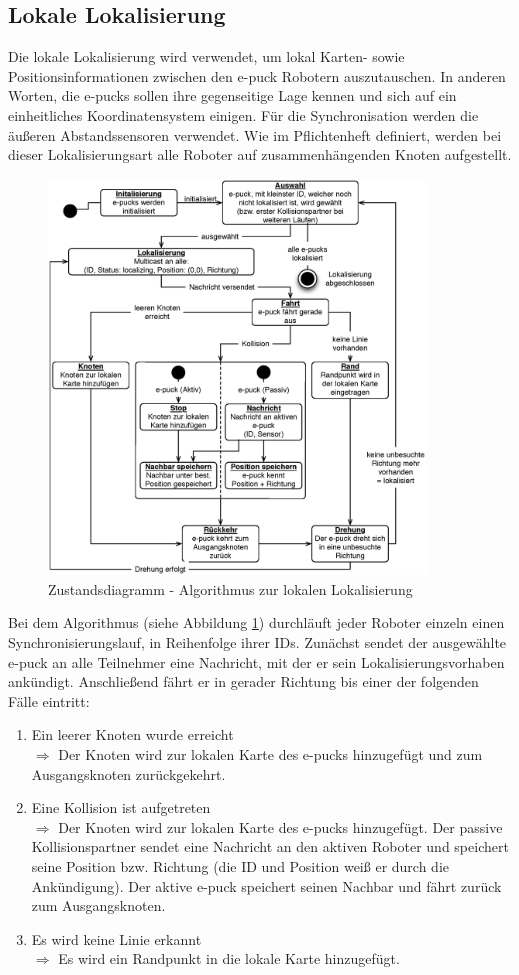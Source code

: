 \documentclass[10pt,a4paper]{article}
\begin{document}
		\subsection{Lokale Lokalisierung}
			Die lokale Lokalisierung wird verwendet, um lokal Karten- sowie Positionsinformationen zwischen den
			e-puck Robotern auszutauschen. In anderen Worten, die e-pucks sollen ihre gegenseitige Lage kennen und sich auf ein einheitliches
			Koordinatensystem einigen. Für die Synchronisation werden die äußeren Abstandssensoren verwendet. Wie im Pflichtenheft definiert,
			werden bei dieser Lokalisierungsart alle Roboter auf zusammenhängenden Knoten aufgestellt.
			 \begin{figure}[h]
				\centering
				\includegraphics[width=10cm]{images/lokale_lokalisierung.eps}
  				\caption{Zustandsdiagramm - Algorithmus zur lokalen Lokalisierung}
  				\label{fig:lokale_lokalisierung}
  			\end{figure}
			Bei dem Algorithmus (siehe Abbildung \ref{fig:lokale_lokalisierung}) durchläuft jeder Roboter einzeln einen Synchronisierungslauf, in Reihenfolge ihrer IDs.
			Zunächst sendet der ausgewählte e-puck an alle Teilnehmer eine Nachricht, mit der er sein Lokalisierungsvorhaben ankündigt.
			Anschließend fährt er in gerader Richtung bis einer der folgenden Fälle eintritt:
			\begin{enumerate}
				\item Ein leerer Knoten wurde erreicht \\
				$\Longrightarrow$ Der Knoten wird zur lokalen Karte des e-pucks hinzugefügt und zum Ausgangsknoten zurückgekehrt.
				\item Eine Kollision ist aufgetreten \\
				$\Longrightarrow$ Der Knoten wird zur lokalen Karte des e-pucks hinzugefügt. Der passive Kollisionspartner sendet eine
				Nachricht an den aktiven Roboter und speichert seine Position bzw. Richtung  (die ID und Position weiß er durch die Ankündigung).
				Der aktive e-puck speichert seinen Nachbar und fährt zurück zum Ausgangsknoten.
				\item Es wird keine Linie erkannt \\
				$\Longrightarrow$ Es wird ein Randpunkt in die lokale Karte hinzugefügt.
			\end{enumerate}
\end{document}
